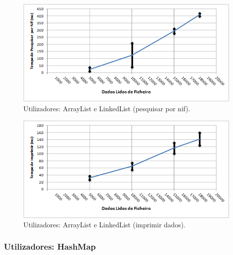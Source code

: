 \documentclass[a5paper,twocolumn, 11pt]{article}
\begin{document}
\begin{figure}[h!b!t!]
    \caption[Utilizadores: ArrayList e Linked List (pesquisar por nif)]{Utilizadores: ArrayList e LinkedList (pesquisar por nif).}
    \label{hashtable}
    \centering
        \includegraphics[width=400pt]{user_c2_o4.png}
\end{figure}
\begin{figure}[h!b!t!]
    \caption[Utilizadores: ArrayList e Linked List (imprimir dados)]{Utilizadores: ArrayList e LinkedList (imprimir dados).}
    \label{hashtable}
    \centering
        \includegraphics[width=400pt]{user_c2_o5.png}
\end{figure}

\newpage
\twocolumn
\subsubsection{Utilizadores: HashMap}
\end{document}
